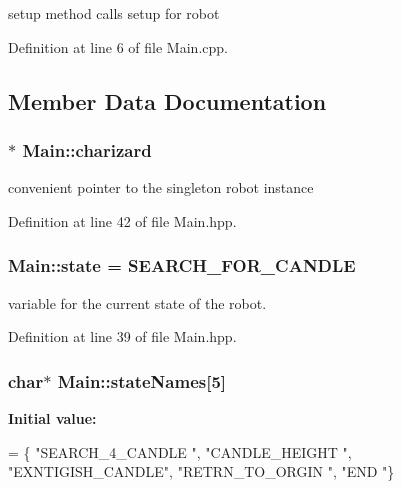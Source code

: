 setup method calls setup for robot 



Definition at line 6 of file Main.\-cpp.



\subsection{Member Data Documentation}
\hypertarget{classMain_a6b8534d72e39e2b43c3d46f2ca6e49f4}{
\subsubsection[{charizard}]{$\ast$ Main\-::charizard\hspace{0.3cm}{\ttfamily [private]}}}\label{classMain_a6b8534d72e39e2b43c3d46f2ca6e49f4}


convenient pointer to the singleton robot instance 



Definition at line 42 of file Main.\-hpp.

\hypertarget{classMain_a8b4ada43c3c3720b177018191ac6ee90}{
\subsubsection[{state}]{ Main\-::state = {\bf S\-E\-A\-R\-C\-H\-\_\-\-F\-O\-R\-\_\-\-C\-A\-N\-D\-L\-E}\hspace{0.3cm}{\ttfamily [private]}}}\label{classMain_a8b4ada43c3c3720b177018191ac6ee90}


variable for the current state of the robot. 



Definition at line 39 of file Main.\-hpp.

\hypertarget{classMain_a10090d1fa7fa606c1bf7c5bdf23d7eda}{
\subsubsection[{state\-Names}]{\setlength{\rightskip}{0pt plus 5cm}char$\ast$ Main\-::state\-Names\mbox{[}5\mbox{]}\hspace{0.3cm}{\ttfamily [private]}}}\label{classMain_a10090d1fa7fa606c1bf7c5bdf23d7eda}
{\bfseries Initial value\-:}
\begin{DoxyCode}
= \{
      \textcolor{stringliteral}{"SEARCH\_4\_CANDLE "},
      \textcolor{stringliteral}{"CANDLE\_HEIGHT   "},
      \textcolor{stringliteral}{"EXNTIGISH\_CANDLE"},
      \textcolor{stringliteral}{"RETRN\_TO\_ORGIN  "},
      \textcolor{stringliteral}{"END             "}\}
\end{DoxyCode}


